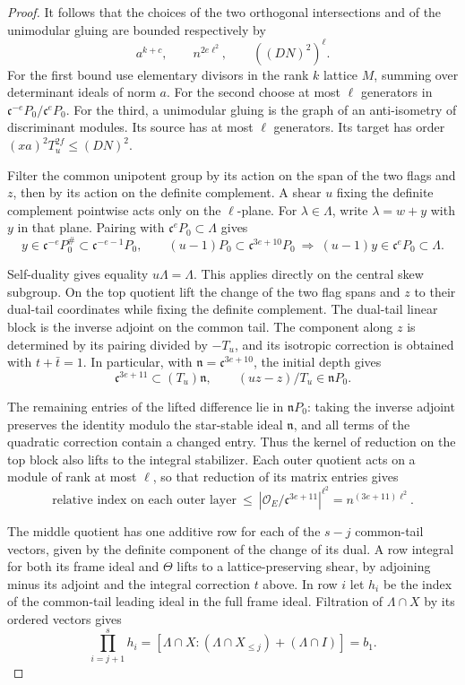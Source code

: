 \begin{proof}
It follows that the choices of the two orthogonal intersections
and of the unimodular gluing are bounded respectively by
\[
       a^{k+c},\qquad n^{2e\ell^2},\qquad ((DN)^2)^\ell .
\]
For the first bound use elementary divisors in the rank \(k\)
lattice \(M\), summing over determinant ideals of norm \(a\).
For the second choose at most \(\ell\) generators in
\(\mathfrak c^{-e}P_0/\mathfrak c^eP_0\). For the third, a
unimodular gluing is the graph of an anti-isometry of discriminant
modules. Its source has at most \(\ell\) generators. Its target
has order \((xa)^2T_u^{2f}\le(DN)^2\).

Filter the common unipotent group by its action on the span of the
two flags and \(z\), then by its action on the definite complement.
A shear \(u\) fixing the definite complement pointwise acts
only on the \(\ell\)-plane. For \(\lambda\in\Lambda\), write
\(\lambda=w+y\) with \(y\) in that plane. Pairing with
\(\mathfrak c^e P_0\subset\Lambda\) gives
\[
 y\in \mathfrak c^{-e}P_0^\#\subset\mathfrak c^{-e-1}P_0,\qquad
 (u-1)P_0\subset\mathfrak c^{3e+10}P_0
 \ \Longrightarrow\
 (u-1)y\in\mathfrak c^e P_0\subset\Lambda .
\]

Self-duality gives equality \(u\Lambda=\Lambda\). This applies
directly on the central skew subgroup. On the top quotient lift
the change of the two flag spans and \(z\) to their dual-tail
coordinates while fixing the definite complement. The dual-tail
linear block is the inverse adjoint on the common tail. The
component along \(z\) is determined by its pairing divided
by \(-T_u\), and its isotropic correction is obtained with
\(t+\bar t=1\). In particular, with
\(\mathfrak n=\mathfrak c^{3e+10}\), the initial depth gives
\[
    \mathfrak c^{3e+11}\subset (T_u)\mathfrak n,\qquad
    (u z-z)/T_u\in\mathfrak n P_0 .
\]

The remaining entries of the lifted difference lie in
\(\mathfrak n P_0\): taking the inverse adjoint preserves the
identity modulo the star-stable ideal \(\mathfrak n\), and all
terms of the quadratic correction contain a changed entry.
Thus the kernel of reduction on the top block also lifts to the
integral stabilizer. Each outer quotient acts on a module of rank
at most \(\ell\), so that reduction of its matrix entries gives
\[
  \text{relative index on each outer layer}
    \ \le\ |\mathcal O_E/\mathfrak c^{3e+11}|^{\ell^2}
    = n^{(3e+11)\ell^2}.
\]

The middle quotient has one additive row for each of the
\(s-j\) common-tail vectors, given by the definite component of
the change of its dual. A row integral for both its frame ideal
and \(\Theta\) lifts to a lattice-preserving shear, by adjoining
minus its adjoint and the integral correction \(t\) above.
In row \(i\) let \(h_i\) be the index of the common-tail leading
ideal in the full frame ideal. Filtration of \(\Lambda\cap X\)
by its ordered vectors gives
\[
 \prod_{i=j+1}^s h_i
   =[\Lambda\cap X:(\Lambda\cap X_{\le j})+(\Lambda\cap I)]
   =b_1 .
\]


\end{proof}
